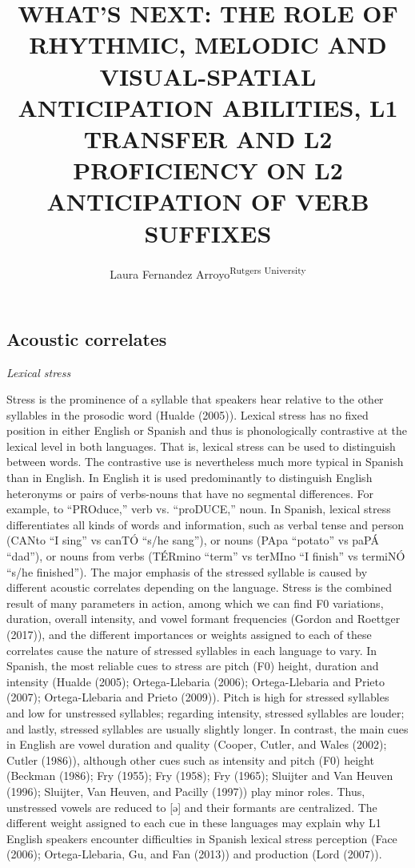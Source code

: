 \documentclass[english,man]{apa6}
\author{Laura Fernandez Arroyo\textsuperscript{Rutgers University}}
\affiliation{\phantom{a}}
\title{WHAT'S NEXT: THE ROLE OF RHYTHMIC, MELODIC AND VISUAL-SPATIAL ANTICIPATION ABILITIES, L1 TRANSFER AND L2 PROFICIENCY ON L2 ANTICIPATION OF VERB SUFFIXES}
\date{}
\begin{document}
\maketitle

\hypertarget{acoustic-correlates}{%
\subsection{Acoustic correlates}\label{acoustic-correlates}}

\emph{Lexical stress}

Stress is the prominence of a syllable that speakers hear relative to the other syllables in the prosodic word (Hualde (2005)). Lexical stress has no fixed position in either English or Spanish and thus is phonologically contrastive at the lexical level in both languages. That is, lexical stress can be used to distinguish between words. The contrastive use is nevertheless much more typical in Spanish than in English. In English it is used predominantly to distinguish English heteronyms or pairs of verbs-nouns that have no segmental differences. For example, to \enquote{PROduce,} verb vs. \enquote{proDUCE,} noun. In Spanish, lexical stress differentiates all kinds of words and information, such as verbal tense and person (CANto \enquote{I sing} vs canTÓ \enquote{s/he sang}), or nouns (PApa \enquote{potato} vs paPÁ \enquote{dad}), or nouns from verbs (TÉRmino \enquote{term} vs terMIno \enquote{I finish} vs termiNÓ \enquote{s/he finished}).
The major emphasis of the stressed syllable is caused by different acoustic correlates depending on the language. Stress is the combined result of many parameters in action, among which we can find F0 variations, duration, overall intensity, and vowel formant frequencies (Gordon and Roettger (2017)), and the different importances or weights assigned to each of these correlates cause the nature of stressed syllables in each language to vary. In Spanish, the most reliable cues to stress are pitch (F0) height, duration and intensity (Hualde (2005); Ortega-Llebaria (2006); Ortega-Llebaria and Prieto (2007); Ortega-Llebaria and Prieto (2009)). Pitch is high for stressed syllables and low for unstressed syllables; regarding intensity, stressed syllables are louder; and lastly, stressed syllables are usually slightly longer. In contrast, the main cues in English are vowel duration and quality (Cooper, Cutler, and Wales (2002); Cutler (1986)), although other cues such as intensity and pitch (F0) height (Beckman (1986); Fry (1955); Fry (1958); Fry (1965); Sluijter and Van Heuven (1996); Sluijter, Van Heuven, and Pacilly (1997)) play minor roles. Thus, unstressed vowels are reduced to {[}ə{]} and their formants are centralized. The different weight assigned to each cue in these languages may explain why L1 English speakers encounter difficulties in Spanish lexical stress perception (Face (2006); Ortega-Llebaria, Gu, and Fan (2013)) and production (Lord (2007)).
\end{document}
